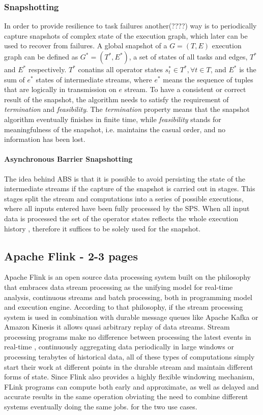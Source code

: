 \subsubsection{Snapshotting}
In order to provide resilience to task failures another(????) way is to periodically capture snapshots of complex state of the execution graph, which later can be used to recover from failures. A global snapshot\cite{abs} of a $G = (T,E)$ execution graph can be defined as $G^{*} = (T^{*},E^{*})$, a set of states of all tasks and edges, $T^{*}$ and $E^{*}$ respectively. $T^{*}$ conatins all operator states $s^{*}_{t} \in T^{*}, \forall t \in T$, and $E^{*}$ is the sum of $e^{*}$ states of intermediate streams, where $e^{*}$ means the sequence of tuples that are logically in transmission on $e$ stream. To have a consistent or correct result of the snapshot, the algorithm needs to satisfy the requirement of \textit{termination} and \textit{feasibility}.
The \textit{termination} property means that the snapshot algorithm eventually finishes in finite time, while \textit{feasibility} stands for meaningfulness of the snapshot, i.e. maintains the casual order, and no information has been lost. 

\paragraph{Asynchronous Barrier Snapshotting}\cite{abs}\label{abs} The idea behind ABS is that it is possible to avoid persisting the state of the intermediate streams if the capture of the snapshot is carried out in stages. This stages split the stream and computations into a series of possible executions, where all inputs entered have been fully processed by the SPS. When all input data is processed the set of the operator states reflects the whole execution history , therefore it suffices to be solely used for the snapshot.



\subsection{Apache Flink - 2-3 pages}
Apache Flink is an open source data processing system built on the philosophy that embraces  data stream processing as the unifying model for real-time analysis, continuous streams and batch processing, both in  programming model and execution engine. 
According to that philosophy, if the stream processing system is used in combination with durable message queues like Apache Kafka or Amazon Kinesis  
it allows quasi arbitrary replay of data streams. Stream processing programs make no difference between processing the latest events in real-time , 
continuously aggregating data periodically in large windows or processing terabytes of historical data, all of these types of computations  simply start their work at 
different points in the durable stream and maintain different forms of state. Since Flink also provides a highly flexible windowing mechanism, 
FLink programs can compute both early and approximate, as well as delayed and accurate results in the same operation obviating the need to combine different systems eventually doing the same jobs. 
for the two use cases.

